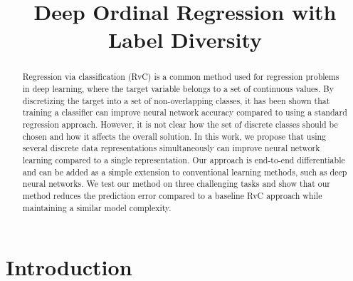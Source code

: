 \documentclass[10pt, conference, a4paper]{IEEEtran}
\begin{document}
\title{Deep Ordinal Regression with Label Diversity}


\author{
}










\maketitle

\begin{abstract}
Regression via classification (RvC) is a common method used for regression problems in deep learning, where the target variable belongs to a set of continuous values. By discretizing the target into a set of non-overlapping classes, it has been shown that training a classifier can improve neural network accuracy compared to using a standard regression approach. However, it is not clear how the set of discrete classes should be chosen and how it affects the overall solution. In this work, we propose that using several discrete data representations simultaneously can improve neural network learning compared to a single representation. Our approach is end-to-end differentiable and can be added as a simple extension to conventional learning methods, such as deep neural networks. We test our method on three challenging tasks and show that our method reduces the prediction error compared to a baseline RvC approach while maintaining a similar model complexity.
\end{abstract}





\IEEEpeerreviewmaketitle



\section{Introduction}
\end{document}
